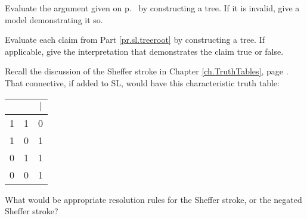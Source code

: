 \solutions
\problempart 
\label{pr.sl.agtree}
Evaluate the argument given on p.\ \pageref{8letterargument} by constructing a tree. If it is invalid, give a model demonstrating it so.

\solutions
\problempart Evaluate each claim from Part \ref{pr.sl.treeroot} by constructing a tree. If applicable, give the interpretation that demonstrates the claim true or false.
\label{tree.examples}

\problempart Recall the discussion of the Sheffer stroke in Chapter \ref{ch.TruthTables}, page \pageref{pr.altConnectives}.  That connective, if added to SL, would have this characteristic truth table:

\begin{center}
\begin{tabular}{c|c|c}
\metaA{} & \metaB{} & \metaA{}$|$\metaB{}\\
\hline
1 & 1 & 0\\
1 & 0 & 1\\
0 & 1 & 1\\
0 & 0 & 1
\end{tabular}
\end{center}

What would be appropriate resolution rules for the Sheffer stroke, or the negated Sheffer stroke?

\fi 
